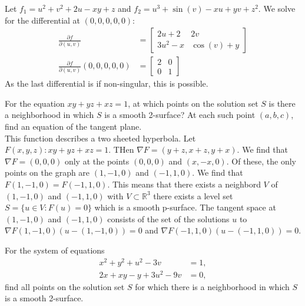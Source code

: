 \documentclass[12pt]{book}
\newcommand{\R}{\mathbb{R}}
\newenvironment{exercise}[2][Exercise]{\begin{trivlist}
\item[\hskip \labelsep {\bfseries #1}\hskip \labelsep {\bfseries #2.}]}{\end{trivlist}}
\begin{document}
\begin{exercise}{7.2.7}
\begin{exercise}{9.7.4}
    Let $f_1 = u^2 + v^2 + 2 u - x y + z $ and $f_2 = u^3 + \sin(v) - x u + yv + z^2 $. We solve for the differential at $(0,0,0,0,0)$:
    \begin{align*}
        \frac{\partial f}{\partial (u,v)} &= \begin{bmatrix} 2 u + 2 & 2v \\ 3u^2-x & \cos(v)+y \end{bmatrix} \\
        \frac{\partial f}{\partial (u,v)} (0,0,0,0,0) &= \begin{bmatrix} 2 & 0 \\ 0 & 1 \end{bmatrix}
    \end{align*}
    As the last differential is if non-singular, this is possible.
\end{exercise}


\begin{exercise}{9.7.6}
    For the equation $xy + yz + xz = 1$, at which points on the solution set $S$ is there a neighborhood in which $S$ is a smooth 2-surface? At each such point $(a,b,c)$, find an equation of the tangent plane.  \\

    This function describes a two sheeted hyperbola. Let $F(x,y,z):  xy + yz + xz =1$.  THen $\nabla F = (y+z, x+z, y+x)$. We find that $\nabla F = (0,0,0)$ only at the points $(0,0,0)$ and $(x,-x,0)$. Of these, the only points on the graph are $(1,-1,0)$ and $(-1,1,0)$. We find that $F(1,-1,0)=F(-1,1,0)$. This means that there exists a neighbord $V$ of $(1,-1,0)$ and $(-1,1,0)$ with $V \subset \R^3$ there exists a level set $S = \{u \in V : F(u)=0\}$ which is a smooth p-surface. The tangent space at $(1,-1,0)$ and $(-1,1,0)$ consists of the set of the solutions $u$ to $\nabla F(1,-1,0) (u - (1,-1,0))=0$ and $\nabla F(-1,1,0) (u - (-1,1,0))=0$.
\end{exercise}


\begin{exercise}{9.7.8}
    For the system of equations
    \begin{align*}
        x^2 + y^2 + u^2 - 3 v &= 1, \\
        2 x + x y - y + 3 u^2 - 9 v &= 0,
    \end{align*}
    find all points on the solution set $S$ for which there is a neighborhood in which $S$ is a smooth 2-surface.  \\


\end{exercise}
\end{exercise}
\end{document}
